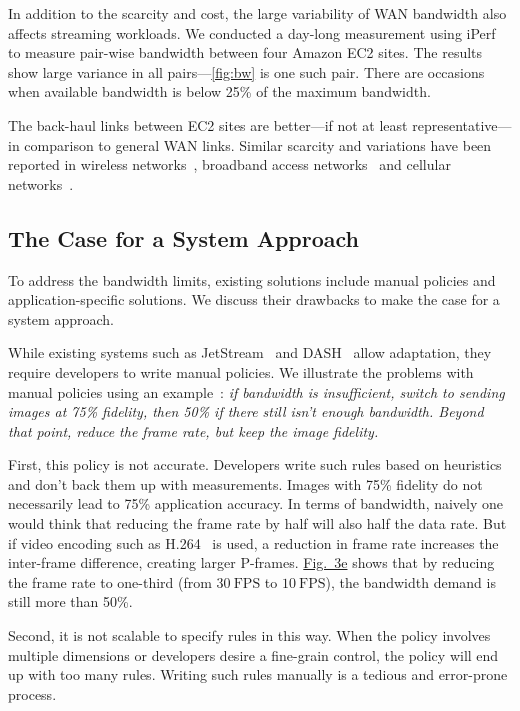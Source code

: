 In addition to the scarcity and cost, the large variability of WAN bandwidth
also affects streaming workloads. We conducted a day-long measurement using
iPerf~\cite{iperf3} to measure pair-wise bandwidth between four Amazon EC2
sites. The results show large variance in all pairs---\autoref{fig:bw} is one
such pair. There are occasions when available bandwidth is below 25\% of the
maximum bandwidth.

The back-haul links between EC2 sites are better---if not at least
representative---in comparison to general WAN links. Similar scarcity and
variations have been reported in wireless networks~\cite{biswas2015large},
broadband access networks~\cite{grover2013peeking, sundaresan2014bismark} and
cellular networks~\cite{nikravesh2014mobile}.

\subsection{The Case for a System Approach}
\label{sec:making-case-sys-approach}

To address the bandwidth limits, existing solutions include manual policies and
application-specific solutions. We discuss their drawbacks to make the case for
a system approach.

 While existing systems such as
JetStream~\cite{rabkin2014aggregation} and DASH~\cite{sodagar2011mpeg} allow
adaptation, they require developers to write manual policies. We illustrate the
problems with manual policies using an example~\cite{rabkin2014aggregation}:
\textit{if bandwidth is insufficient, switch to sending images at 75\% fidelity,
  then 50\% if there still isn't enough bandwidth. Beyond that point, reduce the
  frame rate, but keep the image fidelity.}

First, this policy is not accurate.
Developers write such rules based on heuristics and
don't back them up with measurements. Images with 75\% fidelity do not
necessarily lead to 75\% application accuracy. In terms of bandwidth, naively
one would think that reducing the frame rate by half will also half the data
rate. But if video encoding such as H.264~\cite{richardson2011h} is used, a reduction in frame rate increases the inter-frame difference, creating
larger P-frames. \hyperref[fig:app-specific]{Fig.~3e} shows that by reducing the
frame rate to one-third (from \(30~\text{FPS}\) to \(10~\text{FPS}\)), the bandwidth demand is still more than 50\%.

Second, it is not scalable to specify rules in this way. When the policy involves multiple dimensions
or developers desire a fine-grain control, the policy will end up with too many
rules.  Writing such rules manually is a tedious and error-prone process.


